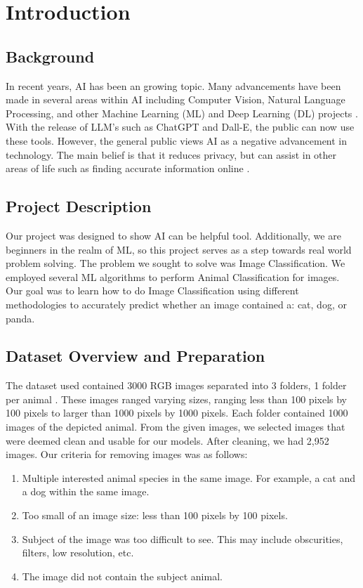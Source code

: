 \section{Introduction}

\subsection{Background}
In recent years, AI has been an growing topic. 
Many advancements have been made in several areas within AI including Computer Vision, Natural Language Processing, and other Machine Learning (ML) and Deep Learning (DL) projects \cite{AIAdv}.
With the release of LLM's such as ChatGPT and Dall-E, the public can now use these tools. 
However, the general public views AI as a negative advancement in technology. 
The main belief is that it reduces privacy, but can assist in other areas of life such as finding accurate information online
\cite{publicOpinion}.


\subsection{Project Description}
Our project was designed to show AI can be helpful tool.
Additionally, we are beginners in the realm of ML, so this project serves as a step towards real world problem solving.
The problem we sought to solve was Image Classification.
We employed several ML algorithms to perform Animal Classification for images.
Our goal was to learn how to do Image Classification using different methodologies to accurately predict whether an image contained a: cat, dog, or panda.

\subsection{Dataset Overview and Preparation}
The dataset used contained 3000 RGB images separated into 3 folders, 1 folder per animal \cite{Dataset}.
These images ranged varying sizes, ranging less than 100 pixels by 100 pixels to larger than 1000 pixels by 1000 pixels.
Each folder contained 1000 images of the depicted animal.
From the given images, we selected images that were deemed clean and usable for our models.
After cleaning, we had 2,952 images.
Our criteria for removing images was as follows:

\begin{enumerate}
    \item Multiple interested animal species in the same image. For example, a cat and a dog within the same image.
    \item Too small of an image size: less than 100 pixels by 100 pixels.
    \item Subject of the image was too difficult to see. This may include obscurities, filters, low resolution, etc.
    \item The image did not contain the subject animal.
\end{enumerate}

